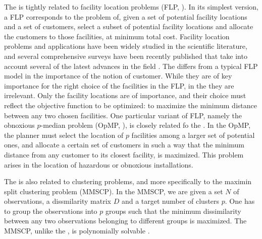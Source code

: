 \documentclass[ijoo,nonblindrev]{informs-ijoo}
\begin{document}
The \pDP{} is tightly related to facility location problems (FLP, \citet{Laporte2015Location}). In its simplest version, a FLP corresponds to the problem of, given a set of potential facility locations and a set of customers, select a subset of potential facility locations and allocate the customers to those facilities, at minimum total cost. Facility location problems and applications have been widely studied in the scientific literature, and several comprehensive surveys have been recently published that take into account several of the latest advances in the field \citep{Laporte2015Location, Melo2009Facility}. The \pDP{} differs from a typical FLP model in the importance of the notion of customer. While they are of key importance for the right choice of the facilities in the FLP, in the \pDP{} they are irrelevant. Only the facility locations are of importance, and their choice must reflect the objective function to be optimized: to maximize the minimum distance between any two chosen facilities. One particular variant of FLP, namely the obnoxious $p$-median problem (OpMP, \citet{Belotti2006branch}), is closely related fo the \pDP{}. In the OpMP, the planner must select the location of $p$ facilities among a larger set of potential ones, and allocate a certain set of customers in such a way that the minimum distance from any customer to its closest facility, is maximized. This problem arises in the location of hazardous or obnoxious installations.

The \pDP{} is also related to clustering problems, and more specifically to the maximin split clustering problem (MMSCP). In the MMSCP, we are given a set $N$ of observations, a dissmilarity matrix $D$ and a target number of clusters $p$. One has to group the observations into $p$ groups such that the minimum dissimilarity between any two observations belonging to different groups is maximized. The MMSCP, unlike the \pDP{}, is polynomially solvable \citep{Delattre1980Bicriterion}.
\end{document}
